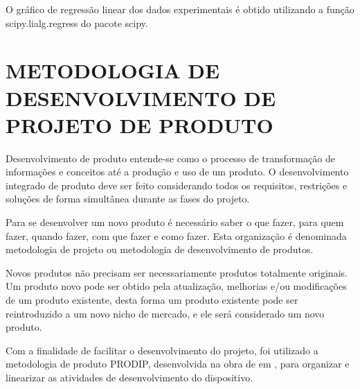O gráfico de regressão linear dos dados experimentais é obtido utilizando a função scipy.lialg.regress do pacote scipy.

\section{METODOLOGIA DE DESENVOLVIMENTO DE PROJETO DE PRODUTO}

Desenvolvimento de produto entende-se como o processo de transformação de informações e conceitos até a produção e uso de um produto. O desenvolvimento integrado de produto deve ser feito considerando todos os requisitos, restrições  e soluções de forma simultânea durante as fases do projeto.

Para se desenvolver um novo produto é necessário saber o que fazer, para quem fazer, quando fazer, com que fazer e como fazer. Esta organização é denominada metodologia de projeto ou metodologia de desenvolvimento de produtos.

Novos produtos não precisam ser necessariamente produtos totalmente originais. Um produto novo pode ser obtido pela atualização, melhorias e/ou modificações de um produto existente, desta forma um produto existente pode ser reintroduzido a um novo nicho de mercado, e ele será considerado um novo produto.

Com a finalidade de facilitar o desenvolvimento do projeto, foi utilizado a metodologia de produto PRODIP, desenvolvida na obra de em \autocite{PRODIP}, para organizar e linearizar as atividades de desenvolvimento do dispositivo.

